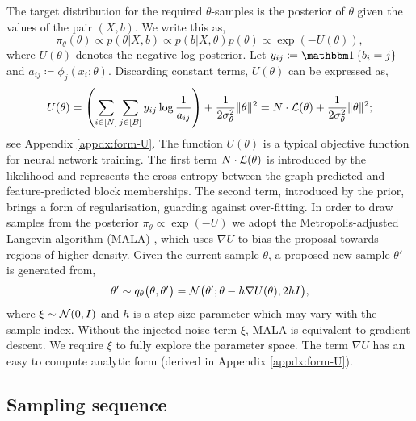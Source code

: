 The target distribution for the required $\theta$-samples 
is the posterior of $\theta$ given the values of the pair $(X, b)$. 
We write this as,
%
\begin{equation}
	\pi_\theta(\theta) \propto p(\theta | X, b) \propto p(b | X, \theta) p(\theta) \propto  \exp \left( - U(\theta) \right),
	\label{eq:U}
\end{equation}
%
where $U(\theta)$ denotes the negative log-posterior. Let $y_{ij} \coloneqq \one \left\{ b_i = j \right\}$ and $a_{ij} \coloneqq \phi_j(x_i; \theta)$. 
Discarding constant terms, $U(\theta)$ can be expressed as,
%
\begin{equation}
	U(\theta) = \left( \sum_{i \in [N]} \sum_{j \in [B]} y_{ij} \log \frac{1}{a_{ij}} \right)
	+ \frac{1}{2\sigma_\theta^2} \|\theta\|^2 = N \cdot \mathcal{L}(\theta) + \frac{1}{2\sigma_\theta^2} \|\theta\|^2;
	\label{eqn:U-form}
\end{equation}
%
see Appendix \ref{appdx:form-U}. The function $U(\theta)$ is a typical objective function for neural network training. The first term $N \cdot \mathcal{L}(\theta)$ is introduced by the likelihood and represents the cross-entropy between the graph-predicted and feature-predicted block memberships. 
The second term, introduced by the prior, brings a form of regularisation, guarding against over-fitting. In order to draw samples from the posterior 
$\pi_\theta \propto \exp(-U)$ we adopt the Metropolis-adjusted Langevin 
algorithm (MALA) \cite{mala-tweedie}, which uses $\nabla U$ to bias the 
proposal towards regions of higher density. Given the current 
sample $\theta$, a proposed 
new sample $\theta'$ is generated from,
%
\begin{equation*}
	\theta' \sim q_\theta\big(\theta, \theta'\big) 
	= \mathcal{N} \big( \theta' ; \theta - h \nabla U(\theta), 2h I \big),
\end{equation*}
%
where $\xi \sim \mathcal{N}(0, I)$ and $h$ is a step-size parameter 
which may vary with the sample index.
Without the injected noise term $\xi$, MALA is equivalent to gradient descent. We require $\xi$ to fully explore the parameter space. 
The term $\nabla U$ has an easy to compute analytic form (derived in Appendix \ref{appdx:form-U}).

\subsection{Sampling sequence}
\label{s:ss}

